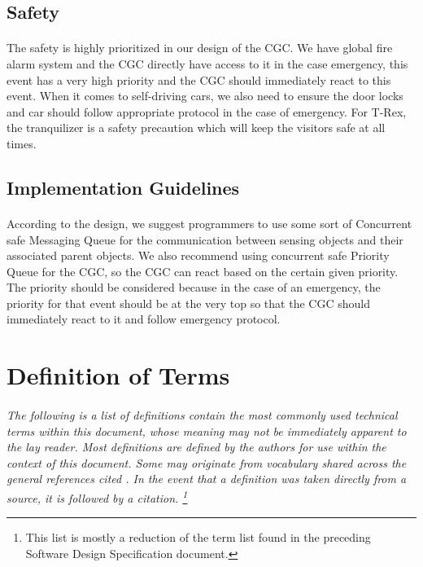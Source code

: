 \documentclass[12pt]{article}
\begin{document}
    \subsection{Safety}
    \paragraph{} The safety is highly prioritized in our design of the CGC. We have 
    global fire alarm system and the CGC directly have access to it in the case 
    emergency, this event has a very high priority and the CGC 
    should immediately react to this event. When it comes to self-driving cars, we also need to ensure the door locks
    and car should follow appropriate protocol in the case of emergency. For T-Rex, the tranquilizer is a safety precaution which will 
    keep the visitors safe at all times.

    \subsection{Implementation Guidelines}
    \paragraph{} According to the design, we suggest programmers to use some sort of 
    Concurrent safe Messaging Queue for the communication between sensing objects and 
    their associated parent objects. We also recommend using concurrent safe Priority 
    Queue for the CGC, so the CGC can react based on the certain given priority. The 
    priority should be considered because in the case of an emergency, the priority 
    for that event should be at the very top so that the CGC should immediately react 
    to it and follow emergency protocol.

\section{Definition of Terms} \label{defs}
\paragraph{} \textit{The following is a list of definitions contain the most commonly used 
technical terms within this document, whose meaning may not be immediately apparent to the 
lay reader. Most definitions are defined by the authors for use within the context of this 
document. Some may originate from vocabulary shared across the general references cited \nocite{*}. 
In the event that a definition was taken directly from a source, it is followed by a citation.
\footnote{This list is mostly a reduction of the term list found in the preceding Software 
Design Specification document.}}
\end{document}
